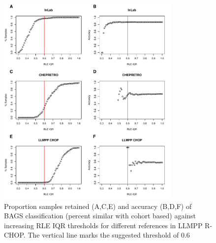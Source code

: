 \begin{figure}
	\begin{center}
		\includegraphics[width=0.8\textwidth]{figures/RCHOP_rle_classification_bags.pdf}
	\end{center}
	\caption{Proportion samples retained (A,C,E) and accuracy (B,D,F) of BAGS classification (percent similar with cohort based) against increasing RLE IQR thresholds for different references in LLMPP R-CHOP. The vertical line marks the suggested threshold of 0.6}
	\label{fig:RCHOP_rle_clas_bags}
\end{figure}

